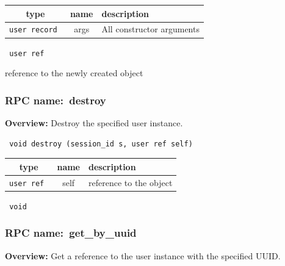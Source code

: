  
\vspace{0.3cm}
\begin{tabular}{|c|c|p{7cm}|}
 \hline
{\bf type} & {\bf name} & {\bf description} \\ \hline
{\tt user record } & args & All constructor arguments \\ \hline 

\end{tabular}

\vspace{0.3cm}

{\tt 
user ref
}


reference to the newly created object
\vspace{0.3cm}
\vspace{0.3cm}
\vspace{0.3cm}
\subsubsection{RPC name:~destroy}

{\bf Overview:} 
Destroy the specified user instance.

\begin{verbatim} void destroy (session_id s, user ref self)\end{verbatim}



 
\vspace{0.3cm}
\begin{tabular}{|c|c|p{7cm}|}
 \hline
{\bf type} & {\bf name} & {\bf description} \\ \hline
{\tt user ref } & self & reference to the object \\ \hline 

\end{tabular}

\vspace{0.3cm}

{\tt 
void
}



\vspace{0.3cm}
\vspace{0.3cm}
\vspace{0.3cm}
\subsubsection{RPC name:~get\_by\_uuid}

{\bf Overview:} 
Get a reference to the user instance with the specified UUID.

